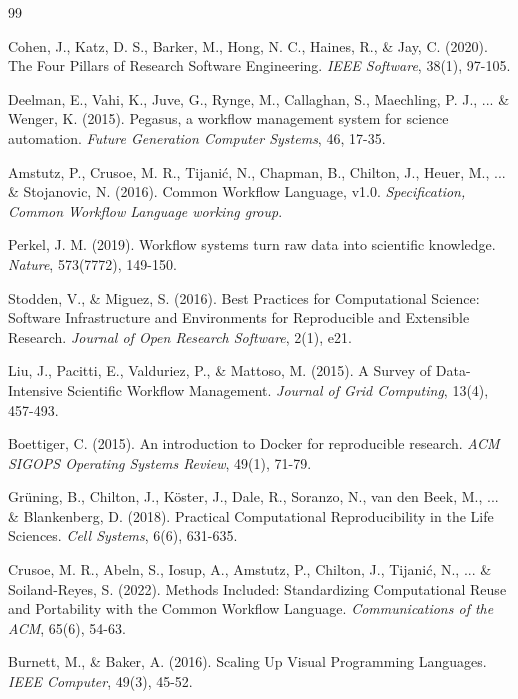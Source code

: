 \documentclass[12pt]{article}
\begin{document}
\newpage
\begin{thebibliography}{99}

Cohen, J., Katz, D. S., Barker, M., Hong, N. C., Haines, R., \& Jay, C. (2020). The Four Pillars of Research Software Engineering. \textit{IEEE Software}, 38(1), 97-105.

Deelman, E., Vahi, K., Juve, G., Rynge, M., Callaghan, S., Maechling, P. J., ... \& Wenger, K. (2015). Pegasus, a workflow management system for science automation. \textit{Future Generation Computer Systems}, 46, 17-35.

Amstutz, P., Crusoe, M. R., Tijanić, N., Chapman, B., Chilton, J., Heuer, M., ... \& Stojanovic, N. (2016). Common Workflow Language, v1.0. \textit{Specification, Common Workflow Language working group}.

Perkel, J. M. (2019). Workflow systems turn raw data into scientific knowledge. \textit{Nature}, 573(7772), 149-150.

Stodden, V., \& Miguez, S. (2016). Best Practices for Computational Science: Software Infrastructure and Environments for Reproducible and Extensible Research. \textit{Journal of Open Research Software}, 2(1), e21.

Liu, J., Pacitti, E., Valduriez, P., \& Mattoso, M. (2015). A Survey of Data-Intensive Scientific Workflow Management. \textit{Journal of Grid Computing}, 13(4), 457-493.

Boettiger, C. (2015). An introduction to Docker for reproducible research. \textit{ACM SIGOPS Operating Systems Review}, 49(1), 71-79.

Grüning, B., Chilton, J., Köster, J., Dale, R., Soranzo, N., van den Beek, M., ... \& Blankenberg, D. (2018). Practical Computational Reproducibility in the Life Sciences. \textit{Cell Systems}, 6(6), 631-635.

Crusoe, M. R., Abeln, S., Iosup, A., Amstutz, P., Chilton, J., Tijanić, N., ... \& Soiland-Reyes, S. (2022). Methods Included: Standardizing Computational Reuse and Portability with the Common Workflow Language. \textit{Communications of the ACM}, 65(6), 54-63.

Burnett, M., \& Baker, A. (2016). Scaling Up Visual Programming Languages. \textit{IEEE Computer}, 49(3), 45-52.


\end{thebibliography}
\end{document}
